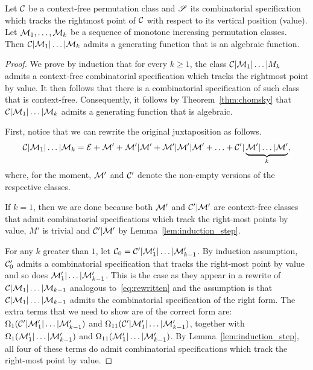\documentclass[12pt, a4paper, twoside]{report}
\begin{document}
\begin{proposition}
  \label{prop:onesidedjuxt}
  Let $\mathcal{C}$ be a context-free permutation class and $\mathscr{S}$ its combinatorial specification which tracks the rightmost point of $\mathcal{C}$ with respect to its vertical position (value). Let $\mathcal{M}_1,\ldots,\mathcal{M}_k$ be a sequence of monotone increasing permutation classes. Then $\mathcal{C}|\mathcal{M}_1|\ldots|\mathcal{M}_k$ admits a generating function that is an algebraic function.
\end{proposition}
\begin{proof}
  We prove by induction that for every $k \geq 1$, the class $\mathcal{C}|\mathcal{M}_1|\ldots|M_k$ admits a context-free combinatorial specification which tracks the rightmost point by value. It then follows that there is a combinatorial specification of such class that is context-free. Consequently, it follows by Theorem~\ref{thm:chomsky} that $\mathcal{C}|\mathcal{M}_1|\ldots|\mathcal{M}_k$ admits a generating function that is algebraic.

  First, notice that we can rewrite the original juxtaposition as follows.
\begin{align}
  \mathcal{C}|\mathcal{M}_1|\ldots|\mathcal{M}_k = \mathcal{E} + \mathcal{M}' + \mathcal{M}'|\mathcal{M}' + \mathcal{M}'|\mathcal{M}'|\mathcal{M}' + \ldots + \mathcal{C}'|\underbrace{\mathcal{M}'|\ldots|\mathcal{M}'}_{k},
\label{eq:rewritten}
\end{align}
 where, for the moment, $\mathcal{M}'$ and $\mathcal{C}'$ denote the non-empty versions of the respective classes.

  If $k = 1$, then we are done because both $\mathcal{M}'$ and $\mathcal{C}'|\mathcal{M}'$ are context-free classes that admit combinatorial specifications which track the right-most points by value, $M'$ is trivial and $\mathcal{C}'|\mathcal{M}'$ by Lemma~\ref{lem:induction_step}.

For any $k$ greater than $1$, let $\mathcal{C}_0 = \mathcal{C}'|\mathcal{M}'_1|\ldots|\mathcal{M}'_{k-1}$. By induction assumption, $\mathcal{C}'_0$ admits a combinatorial specification that tracks the right-most point by value and so does $\mathcal{M}'_1|\ldots|\mathcal{M}'_{k-1}$. This is the case as they appear in a rewrite of $\mathcal{C}|\mathcal{M}_1|\ldots|\mathcal{M}_{k-1}$ analogous to~\eqref{eq:rewritten} and the assumption is that $\mathcal{C}|\mathcal{M}_1|\ldots|\mathcal{M}_{k-1}$ admits the combinatorial specification of the right form.  The extra terms that we need to show are of the correct form are: $\Omega_1(\mathcal{C}'|\mathcal{M}'_1|\ldots|\mathcal{M}'_{k-1})$ and $\Omega_{11}(\mathcal{C}'|\mathcal{M}'_1|\ldots|\mathcal{M}'_{k-1})$, together with $\Omega_1(\mathcal{M}'_1|\ldots|\mathcal{M}'_{k-1})$ and $\Omega_{11}(\mathcal{M}'_1|\ldots|\mathcal{M}'_{k-1})$. By Lemma~\ref{lem:induction_step}, all four of these terms do admit combinatorial specifications which track the right-most point by value.
\end{proof}
\end{document}
